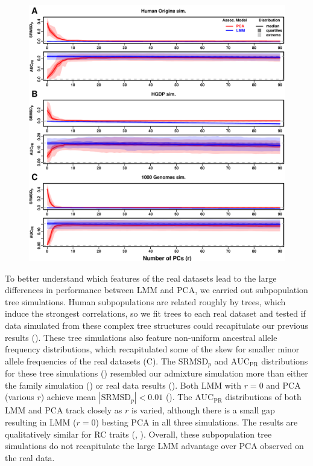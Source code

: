\documentclass[9pt,lineno]{elife}
\newcommand{\rmsd}{\text{SRMSD}_p}
\newcommand{\auc}{\text{AUC}_\text{PR}}
\begin{document}
\begin{figure}
\begin{fullwidth}
{    }{\includegraphics[width=\textwidth,height=\textheight,keepaspectratio]{rmsd-auc-real-sim.pdf}}
    \label{figsupp:rmsd-auc-real-sim-rc}
  \end{fullwidth}
\end{figure}

To better understand which features of the real datasets lead to the large differences in performance between LMM and PCA, we carried out subpopulation tree simulations.
Human subpopulations are related roughly by trees, which induce the strongest correlations, so we fit trees to each real dataset and tested if data simulated from these complex tree structures could recapitulate our previous results ().
These tree simulations also feature non-uniform ancestral allele frequency distributions, which recapitulated some of the skew for smaller minor allele frequencies of the real datasets (C).
The $\rmsd$ and $\auc$ distributions for these tree simulations () resembled our admixture simulation more than either the family simulation () or real data results ().
Both LMM with $r=0$ and PCA (various $r$) achieve mean $|\rmsd| < 0.01$ ().
The $\auc$ distributions of both LMM and PCA track closely as $r$ is varied, although there is a small gap resulting in LMM ($r=0$) besting PCA in all three simulations.
The results are qualitatively similar for RC traits (, ).
Overall, these subpopulation tree simulations do not recapitulate the large LMM advantage over PCA observed on the real data.
\end{document}
